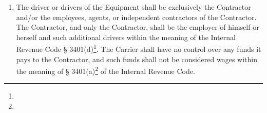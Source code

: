 {\begin{enumerate}[
        ref = \SecondLevelEnumerator
    ]
\begin{enumerate}[
            ref = \ThirdLevelEnumerator
        ]
            \item Self-employment taxes, withholding taxes, FICA taxes,
            unemployment compensation taxes, and any other related taxes
            and obligations.

            \item Provision of workers' compensation insurance and
            occupational accident and disability insurance for all
            personnel and drivers provided by the Contractor, including
            those qualified to operate the Equipment.

            \item The Contractor's management of their employees, agents,
            and independent contractors, including recruitment, dismissal,
            supervision, direction, training, wage setting, work hours and
            conditions, and handling of grievances.

            \item Training the Contractor's employees, agents, and
            independent contractors on the Carrier's policies,
            requirements, and the terms of this Agreement.

            \item All costs associated with commercial driver physical
            qualification tests as required under
            49 CFR {\S\S} 391.41 -- 391.49%
            \footnote{\PhysicalQualificationsAndExaminationsFootnote},
            and any other qualification testing conducted by the Contractor.

            \item All operating costs and expenses incurred by the
            Contractor's employees, agents, and independent contractors
            while operating the Equipment under this Agreement.
        \end{enumerate}

        \item The driver or drivers of the Equipment shall be exclusively
        the Contractor and/or the employees, agents, or independent
        contractors of the Contractor. The Contractor, and only the
        Contractor, shall be the employer of himself or herself and such
        additional drivers within the meaning of the Internal Revenue Code
        {\S} 3401(d)\footnote{\IRSThirdPartyPayerArrangements}. The Carrier
        shall have no control over any funds it pays to the Contractor, and
        such funds shall not be considered wages within the meaning of {\S}
        3401(a)\footnote{\LLITaxWithholding} of the Internal Revenue Code.


\end{enumerate}}
